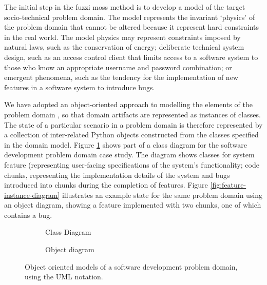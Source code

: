 \documentclass{sig-alternate}
\begin{document}

The initial step in the fuzzi moss method is to develop a model of the target
socio-technical problem domain.  The model represents the invariant `physics' of
the problem domain that cannot be altered because it represent hard constraints
in the real world.  The model physics may represent constraints imposed by
natural laws, such as the conservation of energy; deliberate technical system
design, such as an access control client that limits access to a software system
to those who know an appropriate username and password combination; or emergent
phenomena, such as the tendency for the implementation of new features in a
software system to introduce bugs.

We have adopted an object-oriented approach to modelling the elements of the
problem domain \citep{UMLtextbook}, so that domain artifacts are represented as
instances of classes.  The state of a particular scenario in a problem domain is
therefore represented by a collection of inter-related Python objects
constructed from the classes specified in the domain model.  Figure
\ref{fig:feature-class-diagram} shows part of a class diagram for the software
development problem domain case study.  The diagram shows classes for system
feature (representing user-facing specifications of the system's functionality;
code chunks, representing the implementation details of the system and bugs
introduced into chunks during the completion of features.  Figure
\ref{fig:feature-instance-diagram} illustrates an example state for the same
problem domain using an object diagram, showing a feature implemented with two
chunks, one of which contains a bug.

\begin{figure}
  \centering

  \begin{subfigure}{\linewidth}
    
    \caption{Class Diagram}
  \end{subfigure}

  \begin{subfigure}{\linewidth}
    
    \caption{Object diagram}
  \end{subfigure}

  
  \caption{Object oriented models of a software development problem domain,
    using the UML notation.}
  \label{fig:feature-class-diagram}
\end{figure}
\end{document}
